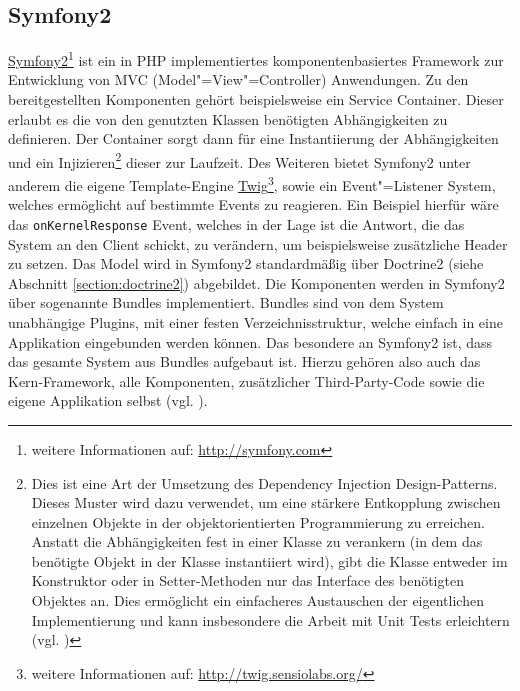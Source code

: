\subsection{Symfony2}\label{section:symfony2}
\href{http://symfony.com}{Symfony2}\footnote{weitere Informationen auf: \url{http://symfony.com}} ist ein in PHP implementiertes komponenten\allowbreak basiertes Framework zur Entwicklung von MVC (Model"=View"=Controller) Anwendungen. Zu den bereitgestellten Komponenten gehört beispielsweise ein Service Container. Dieser erlaubt es die von den genutzten Klassen benötigten Abhängigkeiten zu definieren. Der Container sorgt dann für eine Instantiierung der Abhängigkeiten und ein Injizieren\footnote{Dies ist eine Art der Umsetzung des Dependency Injection Design-Patterns. Dieses Muster wird dazu verwendet, um eine stärkere Entkopplung zwischen einzelnen Objekte in der objektorientierten Programmierung zu erreichen. Anstatt die Abhängigkeiten fest in einer Klasse zu verankern (in dem das benötigte Objekt in der Klasse instantiiert wird), gibt die Klasse entweder im Konstruktor oder in Setter-Methoden nur das Interface des benötigten Objektes an. Dies ermöglicht ein einfacheres Austauschen der eigentlichen Implementierung und kann insbesondere die Arbeit mit Unit Tests erleichtern (vgl. \cite{Fowler2004})} dieser zur Laufzeit. Des Weiteren bietet Symfony2 unter anderem die eigene Template-Engine \href{http://twig.sensiolabs.org/}{Twig}\footnote{weitere Informationen auf: \url{http://twig.sensiolabs.org/}}, sowie ein Event"=Listener System, welches ermöglicht auf bestimmte Events zu reagieren. Ein Beispiel hierfür wäre das \texttt{onKernelResponse} Event, welches in der Lage ist die Antwort, die das System an den Client schickt, zu verändern, um beispielsweise zusätzliche Header zu setzen. Das Model wird in Symfony2 standardmäßig über Doctrine2 (siehe Abschnitt \ref{section:doctrine2}) abgebildet.
Die Komponenten werden in Symfony2 über sogenannte Bundles implementiert. Bundles sind von dem System unabhängige Plugins, mit einer festen Verzeichnisstruktur, welche einfach in eine Applikation eingebunden werden können. Das besondere an Symfony2 ist, dass das gesamte System aus Bundles aufgebaut ist. Hierzu gehören also auch das Kern-Framework, alle Komponenten, zusätzlicher Third-Party-Code sowie die eigene Applikation selbst (vgl. \cite{Symfony2Bundles}).

